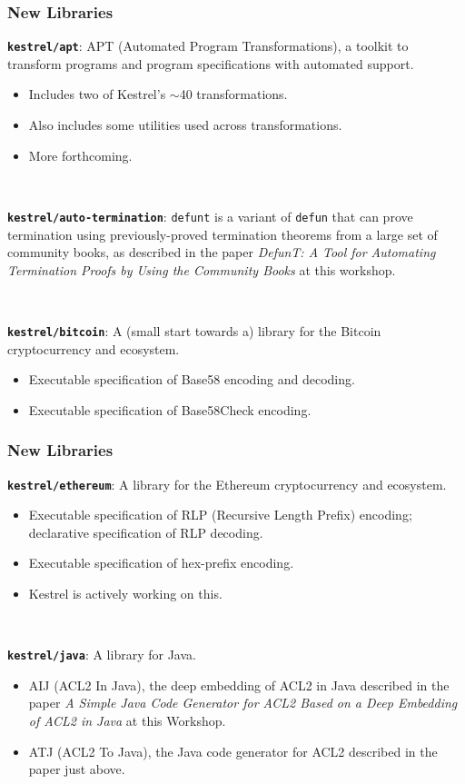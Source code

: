 \documentclass{beamer}
\newcommand{\code}[1]{\texttt{#1}}
\newcommand{\bookpath}[1]{\textbf{\code{#1}}}
\newcommand{\newlibtitle}{\frametitle{New Libraries}}
\begin{document}

\begin{frame}

\newlibtitle

\bookpath{kestrel/apt}:
APT (Automated Program Transformations),
a toolkit
to transform programs and program specifications with automated support.
\begin{itemize}
\item
Includes two of Kestrel's $\sim$40 transformations.
\item
Also includes some utilities used across transformations.
\item
More forthcoming.
\end{itemize}

\

\bookpath{kestrel/auto-termination}:
\code{defunt} is a variant of \code{defun} that can prove termination
using previously-proved termination theorems from a large set of
community books, as described in the paper
\textit{DefunT: A Tool for Automating Termination Proofs
by Using the Community Books}
at this workshop.

\

\bookpath{kestrel/bitcoin}:
A (small start towards a) library for the Bitcoin cryptocurrency and ecosystem.
\begin{itemize}
\item
Executable specification of Base58 encoding and decoding.
\item
Executable specification of Base58Check encoding.
\end{itemize}

\end{frame}


\begin{frame}

\newlibtitle

\bookpath{kestrel/ethereum}:
A library for the Ethereum
cryptocurrency and ecosystem.
\begin{itemize}
\item
Executable specification of RLP (Recursive Length Prefix) encoding;
declarative specification of RLP decoding.
\item
Executable specification of hex-prefix encoding.
\item
Kestrel is actively working on this.
\end{itemize}

\

\bookpath{kestrel/java}:
A library for Java.
\begin{itemize}
\item
AIJ (ACL2 In Java), the deep embedding of ACL2 in Java
described in the paper
\textit{A Simple Java Code Generator for ACL2
Based on a Deep Embedding of ACL2 in Java}
at this Workshop.
\item
ATJ (ACL2 To Java), the Java code generator for ACL2
described in the paper just above.
\end{itemize}

\end{frame}
\end{document}

